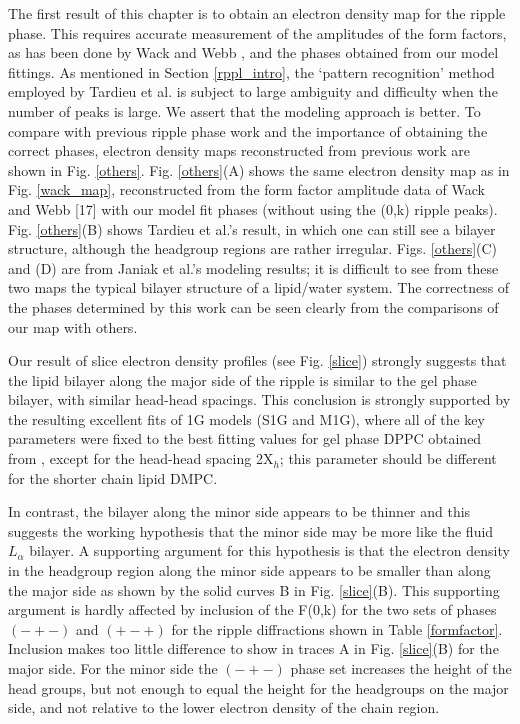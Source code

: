 The first result of this chapter is to obtain an electron density map
for the ripple phase. This requires accurate measurement of the amplitudes
of the form factors, as has been done by Wack and Webb \cite{Wac89a},
and the phases obtained from our model fittings. 
As mentioned in Section
\ref{rppl_intro}, the `pattern recognition' method employed by Tardieu et al. 
\cite{Tar73} is subject to large ambiguity and difficulty when the number
of peaks is large. We assert that the modeling approach is better.
To compare with previous ripple phase work and
the importance of obtaining the correct phases, electron density
maps reconstructed from previous work are shown in Fig. \ref{others}.
Fig. \ref{others}(A) shows the same electron density map as in 
Fig. \ref{wack_map}, reconstructed from the form factor amplitude
data of Wack and Webb [17] with our model fit phases (without using
the (0,k) ripple peaks).
Fig. \ref{others}(B) shows Tardieu et al.'s result, in which 
one can still see a bilayer structure, although the headgroup regions 
are rather irregular. Figs. \ref{others}(C) and (D) are from 
Janiak et al.'s modeling results; it is difficult to see from these two maps
the typical bilayer structure of a lipid/water system. 
The correctness of the phases determined by this work
can be seen clearly from the comparisons of our map with others.


Our result of slice electron density profiles (see Fig. \ref{slice}) 
strongly suggests that the lipid bilayer along the major
side of the ripple is similar to the gel phase bilayer, with similar
head-head spacings. This conclusion is strongly supported by the resulting
excellent fits of 1G models (S1G and M1G), where all of the key parameters
were fixed to the best fitting values for gel phase DPPC obtained from
\cite{MWTH}, except for the head-head spacing 2X$_h$; this parameter
should be different for the shorter chain lipid DMPC. 

In contrast, the bilayer along the minor side appears to be
thinner and this suggests the working hypothesis that the
minor side may be more like the fluid $L_{\alpha}$ bilayer.
A supporting argument for this hypothesis is that the electron density 
in the headgroup region along the minor side appears to be smaller than 
along the major side as shown by the solid curves B in Fig. \ref{slice}(B).  
This supporting argument is hardly affected by inclusion of the
F(0,k) for the two sets of phases $(-+-)$ and $(+-+)$ for the ripple 
diffractions shown in Table \ref{formfactor}.  Inclusion makes too 
little difference to show in traces A in Fig. \ref{slice}(B) 
for the major side.  For the minor side the 
$(-+-)$ phase set increases the height of the head groups, but not
enough to equal the height for the headgroups on the
major side, and not relative to the lower electron density of the 
chain region.

